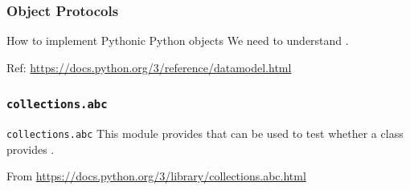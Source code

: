 \documentclass[aspectratio=169,dvipdfmx,12pt,notheorems]{beamer}
\theoremstyle{definition}
\begin{document}
\begin{frame}\frametitle{Object Protocols}

\begin{block}{How to implement Pythonic Python objects}
We need to understand .
\end{block}
Ref: \url{https://docs.python.org/3/reference/datamodel.html}

\end{frame}

\begin{frame}\frametitle{\texttt{collections.abc}}

\begin{block}{\texttt{collections.abc}}
This module provides  that can be used to test whether a class provides .
\end{block}
From \url{https://docs.python.org/3/library/collections.abc.html}

\end{frame}

%
%
%
%

\end{document}

